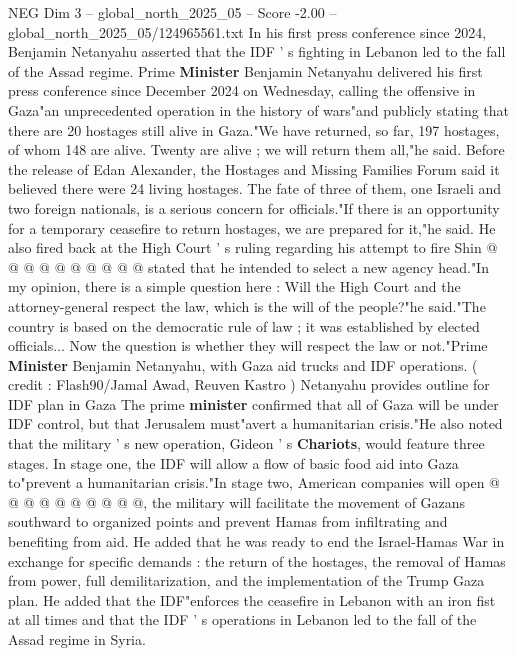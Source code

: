 \begin{textsample}{NEG Dim 3 – global\_north\_2025\_05 – Score -2.00 – global\_north\_2025\_05/124965561.txt}  \label{ex:f3_neg_313}
In his first press conference since 2024, Benjamin Netanyahu asserted that the IDF ' s fighting in Lebanon led to the fall of the Assad regime.
Prime \textbf{Minister} Benjamin Netanyahu delivered his first press conference since December 2024 on Wednesday, calling the offensive in Gaza"an unprecedented operation in the history of wars"and publicly stating that there are 20 hostages still alive in Gaza."We have returned, so far, 197 hostages, of whom 148 are alive.
Twenty are alive ; we will return them all,"he said.
Before the release of Edan Alexander, the Hostages and Missing Families Forum said it believed there were 24 living hostages.
The fate of three of them, one Israeli and two foreign nationals, is a serious concern for officials."If there is an opportunity for a temporary ceasefire to return hostages, we are prepared for it,"he said.
He also fired back at the High Court ' s ruling regarding his attempt to fire Shin @ @ @ @ @ @ @ @ @ @ stated that he intended to select a new agency head."In my opinion, there is a simple question here : Will the High Court and the attorney-general respect the law, which is the will of the people?"he said."The country is based on the democratic rule of law ; it was established by elected officials...
Now the question is whether they will respect the law or not."Prime \textbf{Minister} Benjamin Netanyahu, with Gaza aid trucks and IDF operations. ( credit : Flash90/Jamal Awad, Reuven Kastro ) Netanyahu provides outline for IDF plan in Gaza The prime \textbf{minister} confirmed that all of Gaza will be under IDF control, but that Jerusalem must"avert a humanitarian crisis."He also noted that the military ' s new operation, Gideon ' s \textbf{Chariots}, would feature three stages.
In stage one, the IDF will allow a flow of basic food aid into Gaza to"prevent a humanitarian crisis."In stage two, American companies will open @ @ @ @ @ @ @ @ @ @, the military will facilitate the movement of Gazans southward to organized points and prevent Hamas from infiltrating and benefiting from aid.
He added that he was ready to end the Israel-Hamas War in exchange for specific demands : the return of the hostages, the removal of Hamas from power, full demilitarization, and the implementation of the Trump Gaza plan.
He added that the IDF"enforces the ceasefire in Lebanon with an iron fist at all times and that the IDF ' s operations in Lebanon led to the fall of the Assad regime in Syria.

\end{textsample}
